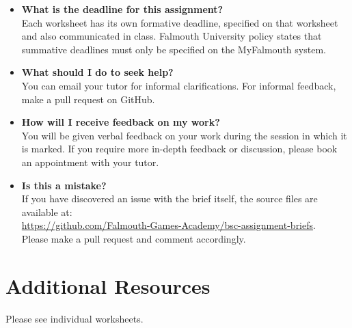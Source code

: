 \documentclass{../../fal_assignment}
\begin{document}
\begin{itemize}
	\item 	\textbf{What is the deadline for this assignment?} \\ 
			Each worksheet has its own formative deadline, specified on that worksheet and also communicated in class.
    		Falmouth University policy states that summative deadlines must only be specified on the MyFalmouth system.
    		
	\item 	\textbf{What should I do to seek help?} \\ 
    		You can email your tutor for informal clarifications. For informal feedback, make a pull request on GitHub. 
    		
	\item 	\textbf{How will I receive feedback on my work?} \\ 
    		You will be given verbal feedback on your work during the session in which it is marked.
    		If you require more in-depth feedback or discussion, please book an appointment with your tutor.
    		
    	\item 	\textbf{Is this a mistake?} \\ 	
    		If you have discovered an issue with the brief itself, the source files are available at: \\
    		\url{https://github.com/Falmouth-Games-Academy/bsc-assignment-briefs}.\\
    		 Please make a pull request and comment accordingly.
\end{itemize}

\section*{Additional Resources}

Please see individual worksheets.

\end{document}
